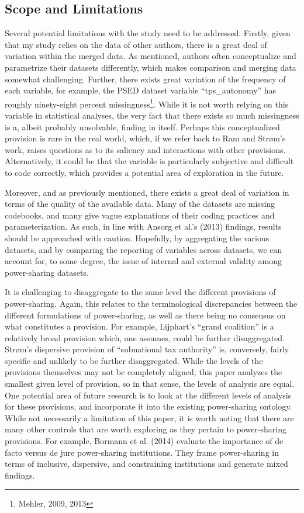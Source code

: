 \documentclass[12pt]{article}
\begin{document}
\subsection{Scope and Limitations}
Several potential limitations with the study need to be addressed. Firstly, given that my study relies on the data of other authors, there is a great deal of variation within the merged data. As mentioned, authors often conceptualize and parametrize their datasets differently, which makes comparison and merging data somewhat challenging. Further, there exists great variation of the frequency of each variable, for example, the PSED dataset variable “tps\_autonomy” has roughly ninety-eight percent missingness\footnote{Mehler, 2009, 2013}. While it is not worth relying on this variable in statistical analyses, the very fact that there exists so much missingness is a, albeit probably unsolvable, finding in itself. Perhaps this conceptualized provision is rare in the real world, which, if we refer back to Ram and Strøm’s work, raises questions as to its saliency and interactions with other provisions. Alternatively, it could be that the variable is particularly subjective and difficult to code correctly, which provides a potential area of exploration in the future. 

Moreover, and as previously mentioned, there exists a great deal of variation in terms of the quality of the available data. Many of the datasets are missing codebooks, and many give vague explanations of their coding practices and parameterization. As such, in line with Ansorg et al.’s (2013) findings, results should be approached with caution. Hopefully, by aggregating the various datasets, and by comparing the reporting of variables across datasets, we can account for, to some degree, the issue of internal and external validity among power-sharing datasets.

It is challenging to disaggregate to the same level the different provisions of power-sharing. Again, this relates to the terminological discrepancies between the different formulations of power-sharing, as well as there being no consensus on what constitutes a provision. For example, Lijphart’s “grand coalition” is a relatively broad provision which, one assumes, could be further disaggregated. Strøm’s dispersive provision of “subnational tax authority” is, conversely, fairly specific and unlikely to be further disaggregated. While the levels of the provisions themselves may not be completely aligned, this paper analyzes the smallest given level of provision, so in that sense, the levels of analysis are equal. One potential area of future research is to look at the different levels of analysis for these provisions, and incorporate it into the existing power-sharing ontology. While not necessarily a limitation of this paper, it is worth noting that there are many other controls that are worth exploring as they pertain to power-sharing provisions. For example, Bormann et al. (2014) evaluate the importance of de facto versus de jure power-sharing institutions. They frame power-sharing in terms of inclusive, dispersive, and constraining institutions and generate mixed findings. 
\end{document}
